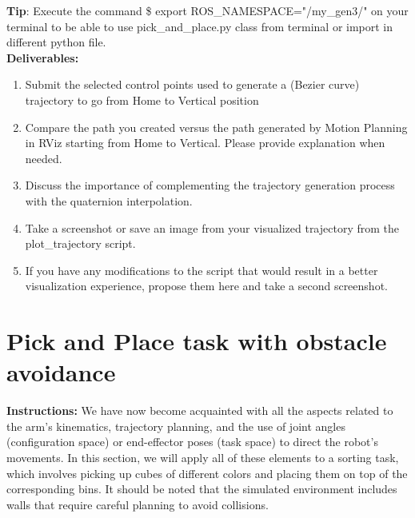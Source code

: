 \documentclass[12pt]{article}
\begin{document}
\textbf{Tip}: Execute the command 
   \$ export ROS\_NAMESPACE="/my\_gen3/"
on your terminal to be able to use pick\_and\_place.py class from terminal or import in different python file.\\

\textbf{Deliverables:}
\begin{enumerate}
    \item Submit the selected control points used to generate a (Bezier curve) trajectory to go from Home to Vertical position
    
    \item Compare the path you created versus the path generated by Motion Planning in RViz starting from Home to Vertical. Please provide explanation when needed.
    
    \item Discuss the importance of complementing the trajectory generation process with the quaternion interpolation.
    
    \item Take a screenshot or save an image from your visualized trajectory from the plot\_trajectory script.
    
    \item If you have any modifications to the script that would result in a better visualization experience, propose them here and take a second screenshot.
\end{enumerate}
    
    

\section{Pick and Place task with obstacle avoidance}

\textbf{Instructions:}
We have now become acquainted with all the aspects related to the arm's kinematics, trajectory planning, and the use of joint angles (configuration space) or end-effector poses (task space) to direct the robot's movements. In this section, we will apply all of these elements to a sorting task, which involves picking up cubes of different colors and placing them on top of the corresponding bins. It should be noted that the simulated environment includes walls that require careful planning to avoid collisions.
\end{document}
